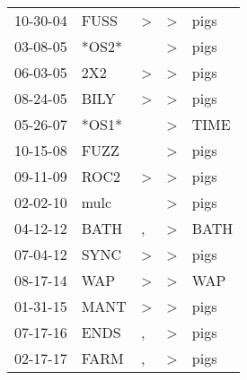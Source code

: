\begin{supertabular}{p{0.07\textwidth}p{0.06\textwidth}p{0.02\textwidth}p{0.02\textwidth}p{0.06\textwidth}}
 10-30-04\textsuperscript{} &  FUSS\textsuperscript{} &  \textgreater &  \textgreater &  pigs\textsuperscript{} \\
 03-08-05\textsuperscript{} &                   *OS2* &               &  \textgreater &  pigs\textsuperscript{} \\
 06-03-05\textsuperscript{} &   2X2\textsuperscript{} &  \textgreater &  \textgreater &  pigs\textsuperscript{} \\
 08-24-05\textsuperscript{} &  BILY\textsuperscript{} &  \textgreater &  \textgreater &  pigs\textsuperscript{} \\
 05-26-07\textsuperscript{} &                   *OS1* &               &  \textgreater &  TIME\textsuperscript{} \\
 10-15-08\textsuperscript{} &  FUZZ\textsuperscript{} &               &  \textgreater &  pigs\textsuperscript{} \\
 09-11-09\textsuperscript{} &  ROC2\textsuperscript{} &  \textgreater &  \textgreater &  pigs\textsuperscript{} \\
 02-02-10\textsuperscript{} &  mulc\textsuperscript{} &               &  \textgreater &  pigs\textsuperscript{} \\
 04-12-12\textsuperscript{} &  BATH\textsuperscript{} &             , &  \textgreater &  BATH\textsuperscript{} \\
 07-04-12\textsuperscript{} &  SYNC\textsuperscript{} &  \textgreater &  \textgreater &  pigs\textsuperscript{} \\
 08-17-14\textsuperscript{} &   WAP\textsuperscript{} &  \textgreater &  \textgreater &   WAP\textsuperscript{} \\
 01-31-15\textsuperscript{} &  MANT\textsuperscript{} &  \textgreater &  \textgreater &  pigs\textsuperscript{} \\
 07-17-16\textsuperscript{} &  ENDS\textsuperscript{} &             , &  \textgreater &  pigs\textsuperscript{} \\
 02-17-17\textsuperscript{} &  FARM\textsuperscript{} &             , &  \textgreater &  pigs\textsuperscript{} \\
\end{supertabular}
